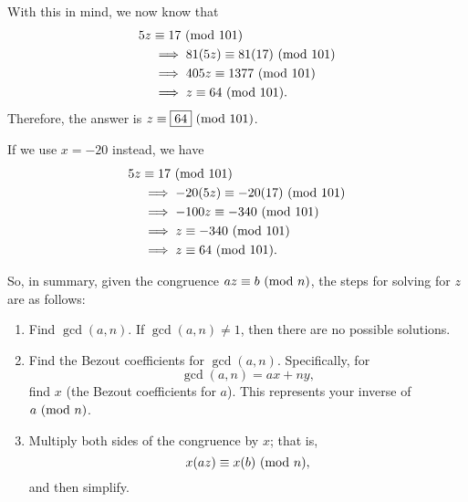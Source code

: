 \documentclass[letterpaper]{article}
\begin{document}
\begin{mdframed}
\begin{itemize}
\begin{mdframed}
            With this in mind, we now know that 
            \begin{equation*}
                \begin{aligned}
                    5z &\equiv 17 \ (\mathrm{mod}\ 101) \\ 
                        &\implies 81(5z) \equiv 81(17) \ (\mathrm{mod}\ 101) \\ 
                        &\implies 405z \equiv 1377 \ (\mathrm{mod}\ 101) \\ 
                        &\implies z \equiv 64 \ (\mathrm{mod}\ 101).
                \end{aligned}
            \end{equation*}
            Therefore, the answer is $z \equiv \boxed{64} \ (\mathrm{mod}\ 101)$.

            \begin{mdframed}
                If we use $x = -20$ instead, we have 
                \begin{equation*}
                    \begin{aligned}
                        5z &\equiv 17 \ (\mathrm{mod}\ 101) \\ 
                            &\implies -20(5z) \equiv -20(17) \ (\mathrm{mod}\ 101) \\ 
                            &\implies -100z \equiv -340 \ (\mathrm{mod}\ 101) \\ 
                            &\implies z \equiv -340 \ (\mathrm{mod}\ 101) \\ 
                            &\implies z \equiv 64 \ (\mathrm{mod}\ 101).
                    \end{aligned}
                \end{equation*}
            \end{mdframed}
        \end{mdframed}
    \end{itemize}
\end{mdframed}
So, in summary, given the congruence $az \equiv b \ (\mathrm{mod}\ n)$, the steps for solving for $z$ are as follows: 
\begin{enumerate}
    \item Find $\gcd(a, n)$. If $\gcd(a, n) \neq 1$, then there are no possible solutions.
    \item Find the Bezout coefficients for $\gcd(a, n)$. Specifically, for \[\gcd(a, n) = ax + ny,\] find $x$ (the Bezout coefficients for $a$). This represents your inverse of $a \ (\mathrm{mod}\ n)$.
    \item Multiply both sides of the congruence by $x$; that is, 
    \[x(az) \equiv x(b) \ (\mathrm{mod}\ n),\]
    and then simplify.
\end{enumerate}
\end{document}
